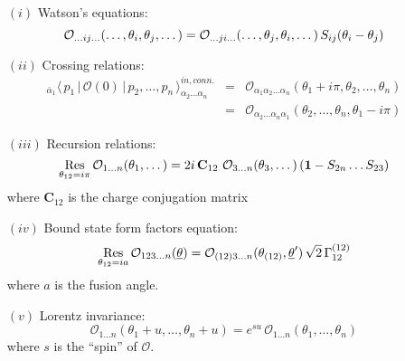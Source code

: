 \documentclass[a4paper,12pt]{article}
\def\limfunc#1{\mathop{\rm #1}}%
\begin{document}
\begin{enumerate}
\item[$(i)$]  Watson's equations: 
\[
\mathcal{O}_{\dots ij\dots }(\dots ,\theta _{i},\theta _{j},\dots )=\mathcal{%
O}_{\dots ji\dots }(\dots ,\theta _{j},\theta _{i},\dots )\,S_{ij}(\theta
_{i}-\theta _{j}) 
\]

\item[$(ii)$]  Crossing relations: 
\begin{eqnarray*}
_{\bar{\alpha}_{1}}\langle \,p_{1}\,|\,\mathcal{O}(0)\,|\,p_{2},\dots
,p_{n}\,\rangle _{\alpha _{2}\dots \alpha _{n}}^{in,conn.} &=&\mathcal{O}%
_{\alpha _{1}\alpha _{2}\dots \alpha _{n}}(\theta _{1}+i\pi ,\theta
_{2},\dots ,\theta _{n}) \\
&=&\mathcal{O}_{\alpha _{2}\dots \alpha _{n}\alpha _{1}}(\theta _{2},\dots
,\theta _{n},\theta _{1}-i\pi )
\end{eqnarray*}

\item[$(iii)$]  Recursion relations: 
\[
\limfunc{Res}\limits_{\theta _{12}=i\pi }\mathcal{O}_{1\dots n}(\theta
_{1},\dots )=2i\,\mathbf{C}_{12}\,\,\mathcal{O}_{3\dots n}(\theta _{3},\dots
)\left( \mathbf{1}-S_{2n}\dots S_{23}\right) 
\]
where $\mathbf{C}_{12}$ is the charge conjugation matrix

\item[$(iv)$]  Bound state form factors equation: 
\[
\limfunc{Res}\limits_{\theta _{12}=ia}\mathcal{O}_{123\dots n}(\underline{%
\theta })=\mathcal{O}_{(12)3\dots n}(\theta _{(12)},\underline{\theta }%
^{\prime })\,\sqrt{2}\,\Gamma _{12}^{(12)} 
\]
where $a$ is the fusion angle.

\item[$(v)$]  Lorentz invariance: 
\[
\mathcal{O}_{1\dots n}(\theta _{1}+u,\dots ,\theta _{n}+u)=e^{su}\,\mathcal{O%
}_{1\dots n}(\theta _{1},\dots ,\theta _{n}) 
\]
where $s$ is the ``spin'' of $\mathcal{O}$.
\end{enumerate}
\end{document}
